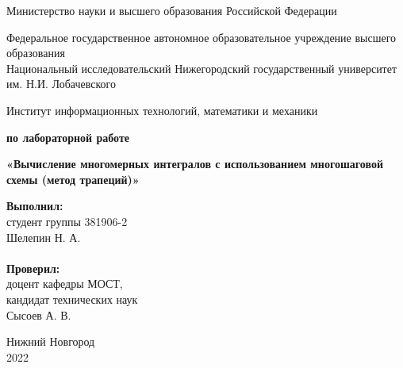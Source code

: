\documentclass{report}
\begin{document}
\begin{titlepage}

\begin{center}
Министерство науки и высшего образования Российской Федерации
\end{center}

\begin{center}
Федеральное государственное автономное образовательное учреждение высшего образования \\
Национальный исследовательский Нижегородский государственный университет им. Н.И. Лобачевского
\end{center}

\begin{center}
Институт информационных технологий, математики и механики
\end{center}

\vspace{4em}

\begin{center}
\textbf{ по лабораторной работе} \\
\end{center}
\begin{center}
\textbf{\Large«Вычисление многомерных интегралов с использованием многошаговой схемы (метод трапеций)»} \\
\end{center}

\vspace{4em}

\newbox{\lbox}
\newlength{\maxl}
\setlength{\maxl}{\wd\lbox}
\hfill\parbox{7cm}{
\hspace*{5cm}\hspace*{-5cm}\textbf{Выполнил:} \\ студент группы 381906-2 \\ Шелепин Н. А.\\
\\
\hspace*{5cm}\hspace*{-5cm}\textbf{Проверил:}\\ доцент кафедры МОСТ, \\ кандидат технических наук \\ Сысоев А. В.\\
}
\vspace{\fill}

\begin{center} Нижний Новгород \\ 2022 \end{center}

\end{titlepage}
\end{document}
